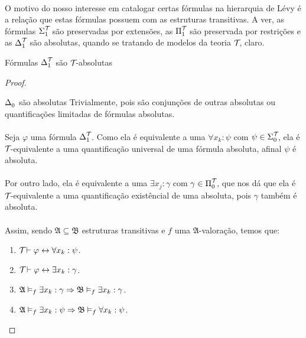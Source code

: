             \paragraph{}
                O motivo do nosso interesse em catalogar certas fórmulas na hierarquia de Lévy é a relação que 
                estas fórmulas possuem com as estruturas transitivas. A ver, as fórmulas 
                $\Sigma^{\mathcal{T}_{}}_{1}$ são preservadas por extensões, as $\Pi^{\mathcal{T}_{}}_{1}$ são 
                preservada por restrições e as $\Delta^{\mathcal{T}_{}}_{1}$ são absolutas, quando se tratando de 
                modelos da teoria $\mathcal{T}_{}$, claro.
            \begin{theorem}{Fórmulas $\Delta^{\mathcal{T}_{}}_{1}$ são $\mathcal{T}_{}$-absolutas}
                \begin{proof}
                    \begin{lemma}{$\Delta^{}_{0}$ são absolutas}
                        Trivialmente, pois são conjunções de outras absolutas ou quantificações limitadas de 
                        fórmulas absolutas. 
                    \end{lemma}
                    \paragraph{}
                        Seja $\varphi$ uma fórmula $\Delta^{\mathcal{T}_{}}_{1}$. Como ela é equivalente a uma $\forall x_k:\psi$ com 
                        $\psi\in\Sigma^{\mathcal{T}_{}}_{0}$, ela é $\mathcal{T}_{}$-equivalente a uma quantificação universal de uma 
                        fórmula absoluta, afinal $\psi$ é absoluta.
                    \paragraph{}
                        Por outro lado, ela é equivalente a uma $\exists x_j:\gamma$ com $\gamma\in\Pi^{\mathcal{T}_{}}_{0}$, que 
                        nos dá que ela é $\mathcal{T}_{}$-equivalente a uma quantificação existêncial de uma absoluta, pois $\gamma$
                        também é absoluta.
                    \paragraph{}
                        Assim, sendo $\mathfrak{A}\subseteq\mathfrak{B}$ estruturas transitivas e $f$ uma $\mathfrak{A}$-valoração, 
                        temos que:
                    \begin{enumerate}[label=\alph*)]
                        \item $\mathcal{T}_{}\vdash\varphi\leftrightarrow\forall x_k:\psi$.
                        \item $\mathcal{T}_{}\vdash\varphi\leftrightarrow\exists x_k:\gamma$.
                        \item $\mathfrak{A}\vDash_f\exists x_k:\gamma\Rightarrow\mathfrak{B}\vDash_f\exists x_k:\gamma$.
                        \item $\mathfrak{A}\vDash_f\exists x_k:\psi  \Rightarrow\mathfrak{B}\vDash_f\forall x_k:\psi$.
                    \end{enumerate}

\end{proof}
\end{theorem}
